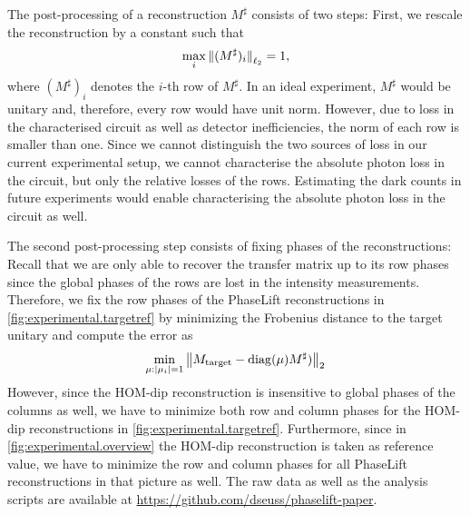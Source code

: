 The post-processing of a reconstruction ${M}^\sharp$ consists of two steps:
First, we rescale the reconstruction by a constant such that
\[
  \label{eq:pl.experimental_details.data.scaling}
  \max_i {\Vert(M^\sharp)_i\Vert}_{\ell_2} = 1,
\]
where $(M^\sharp)_i$ denotes the $i$-th row of $M^\sharp$.
In an ideal experiment, $M^\sharp$ would be unitary and, therefore, every row would have unit norm.
However, due to loss in the characterised circuit as well as detector inefficiencies, the norm of each row is smaller than one.
Since we cannot distinguish the two sources of loss in our current experimental setup, we cannot characterise the absolute photon loss in the circuit, but only the relative losses of the rows.
Estimating the dark counts in future experiments would enable characterising the absolute photon loss in the circuit as well.

The second post-processing step consists of fixing phases of the reconstructions:
Recall that we are only able to recover the transfer matrix up to its row phases since the global phases of the rows are lost in the intensity measurements.
Therefore, we fix the row phases of the PhaseLift reconstructions in \cref{fig:experimental.targetref} by minimizing the Frobenius distance to the target unitary and compute the error as
\[
  \min_{{\mu}: {\vert\mu_i\vert} = 1}\left\|  {M}_\mathrm{target} -  \mathrm{diag} ({\mu}) {M}^\sharp) \right\|_2
\]
However, since the HOM-dip reconstruction is insensitive to global phases of the columns as well, we have to minimize both row and column phases for the HOM-dip reconstructions in \cref{fig:experimental.targetref}.
Furthermore, since in \cref{fig:experimental.overview} the HOM-dip reconstruction is taken as reference value, we have to minimize the row and column phases for all PhaseLift reconstructions in that picture as well.
The raw data as well as the analysis scripts are available at \url{https://github.com/dseuss/phaselift-paper}.
